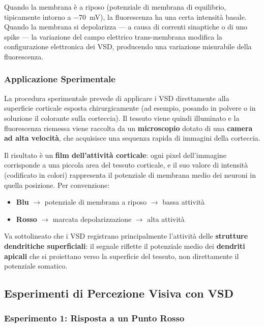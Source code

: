 Quando la membrana è a riposo (potenziale di membrana di equilibrio, tipicamente intorno a $-70$~mV), la fluorescenza ha una certa intensità basale. Quando la membrana si depolarizza — a causa di correnti sinaptiche o di uno spike — la variazione del campo elettrico trans-membrana modifica la configurazione elettronica dei VSD, producendo una variazione misurabile della fluorescenza.

\subsubsection{Applicazione Sperimentale}

La procedura sperimentale prevede di applicare i VSD direttamente alla superficie corticale esposta chirurgicamente (ad esempio, posando in polvere o in soluzione il colorante sulla corteccia). Il tessuto viene quindi illuminato e la fluorescenza riemessa viene raccolta da un \textbf{microscopio} dotato di una \textbf{camera ad alta velocità}, che acquisisce una sequenza rapida di immagini della corteccia.

Il risultato è un \textbf{film dell'attività corticale}: ogni pixel dell'immagine corrisponde a una piccola area del tessuto corticale, e il suo valore di intensità (codificato in colori) rappresenta il potenziale di membrana medio dei neuroni in quella posizione. Per convenzione:

\begin{itemize}
    \item \textbf{Blu} $\rightarrow$ potenziale di membrana a riposo $\rightarrow$ bassa attività
    \item \textbf{Rosso} $\rightarrow$ marcata depolarizzazione $\rightarrow$ alta attività
\end{itemize}

Va sottolineato che i VSD registrano principalmente l'attività delle \textbf{strutture dendritiche superficiali}: il segnale riflette il potenziale medio dei \textbf{dendriti apicali} che si proiettano verso la superficie del tessuto, non direttamente il potenziale somatico.


\subsection{Esperimenti di Percezione Visiva con VSD}

\subsubsection{Esperimento 1: Risposta a un Punto Rosso}

